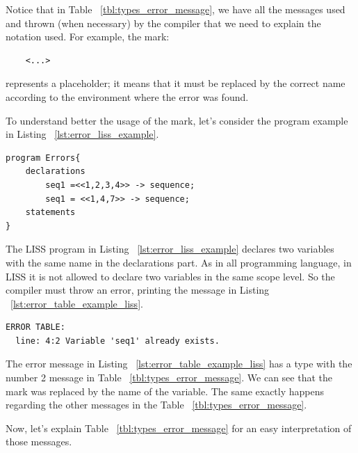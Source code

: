 \documentclass[
  oneside,
  11pt, a4paper,
  footinclude=true,
  headinclude=true,
  cleardoublepage=empty
]{scrbook}
\begin{document}
Notice that in Table ~\ref{tbl:types_error_message}, we have all the messages used and thrown (when necessary) by the compiler that we need to explain the notation used.
For example, the mark:
\begin{lstlisting}
	<...>
\end{lstlisting}
represents  a placeholder; it means that it must be replaced by the correct name according to the environment where the error was found.

To understand better the usage of the mark, let's consider the program example in Listing ~\ref{lst:error_liss_example}.
\begin{lstlisting}[label={lst:error_liss_example},caption={Partial Listing}]
program Errors{
	declarations
		seq1 =<<1,2,3,4>> -> sequence;
		seq1 = <<1,4,7>> -> sequence;
	statements
}
\end{lstlisting}

The LISS program in Listing ~\ref{lst:error_liss_example} declares two variables with the same name in the declarations part. As in all programming language, in LISS it is not allowed to declare two variables in the same scope level. So the compiler must throw an error, printing the message in Listing ~\ref{lst:error_table_example_liss}.

\begin{lstlisting}[label={lst:error_table_example_liss},caption={Error table related to Listing ~\ref{lst:error_liss_example}}]
  ERROR TABLE:
  line: 4:2	Variable 'seq1' already exists.
\end{lstlisting}

The error message in Listing ~\ref{lst:error_table_example_liss} has a type with the number 2 message in Table ~\ref{tbl:types_error_message}.
We can see that the mark was replaced by the name of the variable.
The same exactly happens regarding the other messages in the Table ~\ref{tbl:types_error_message}.

Now, let's explain Table ~\ref{tbl:types_error_message} for an easy interpretation of those messages.
\end{document}
